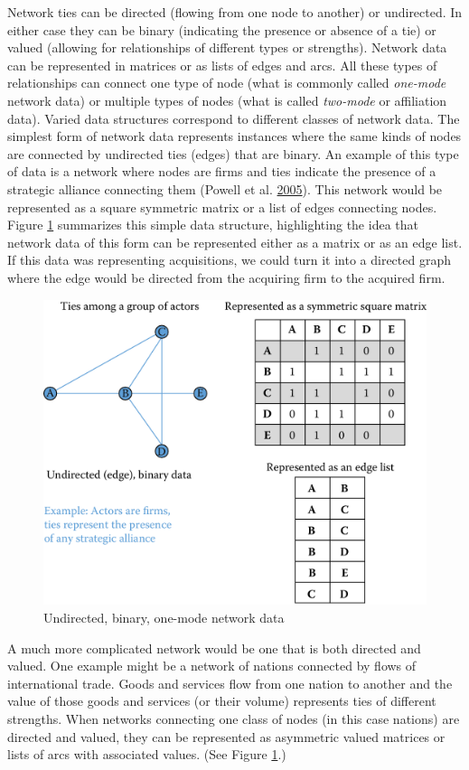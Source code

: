 \documentclass[]{krantz}
\begin{document}
Network ties can be directed (flowing from one node to another) or
undirected. In either case they can be binary (indicating the presence
or absence of a tie) or valued (allowing for relationships of different
types or strengths). Network data can be represented in matrices or as
lists of edges and arcs. All these types of relationships can connect
one type of node (what is commonly called \emph{one-mode} network data)
or multiple types of nodes (what is called \emph{two-mode} or
affiliation data). Varied data structures correspond to different
classes of network data. The simplest form of network data represents
instances where the same kinds of nodes are connected by undirected ties
(edges) that are binary. An example of this type of data is a network
where nodes are firms and ties indicate the presence of a strategic
alliance connecting them (Powell et al.
\protect\hyperlink{ref-powell2005network}{2005}). This network would be
represented as a square symmetric matrix or a list of edges connecting
nodes. Figure \ref{fig:fig8-1} summarizes this simple data structure,
highlighting the idea that network data of this form can be represented
either as a matrix or as an edge list. If this data was representing
acquisitions, we could turn it into a directed graph where the edge
would be directed from the acquiring firm to the acquired firm.

\begin{figure}

{\centering \includegraphics[width=0.7\linewidth]{ChapterNetworks/figures/fig8-1} 

}

\caption{Undirected, binary, one-mode network data}\label{fig:fig8-1}
\end{figure}

A much more complicated network would be one that is both directed and
valued. One example might be a network of nations connected by flows of
international trade. Goods and services flow from one nation to another
and the value of those goods and services (or their volume) represents
ties of different strengths. When networks connecting one class of nodes
(in this case nations) are directed and valued, they can be represented
as asymmetric valued matrices or lists of arcs with associated values.
(See Figure \ref{fig:fig8-1}.)
\end{document}
